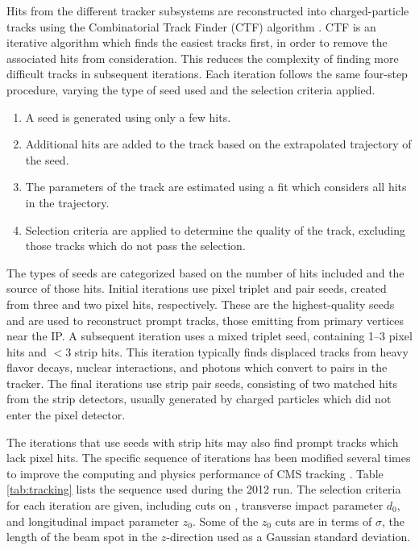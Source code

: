 Hits from the different tracker subsystems are reconstructed into charged-particle tracks using the Combinatorial Track Finder (CTF) algorithm \cite{TrackingJINST}. CTF is an iterative algorithm which finds the easiest tracks first, in order to remove the associated hits from consideration. This reduces the complexity of finding more difficult tracks in subsequent iterations. Each iteration follows the same four-step procedure, varying the type of seed used and the selection criteria applied.
\begin{enumerate}
\item A seed is generated using only a few hits.
\item Additional hits are added to the track based on the extrapolated trajectory of the seed.
\item The parameters of the track are estimated using a fit which considers all hits in the trajectory.
\item Selection criteria are applied to determine the quality of the track, excluding those tracks which do not pass the selection.
\end{enumerate}

The types of seeds are categorized based on the number of hits included and the source of those hits. Initial iterations use pixel triplet and pair seeds, created from three and two pixel hits, respectively. These are the highest-quality seeds and are used to reconstruct prompt tracks, those emitting from primary vertices near the IP. A subsequent iteration uses a mixed triplet seed, containing 1--3 pixel hits and ${<}3$ strip hits. This iteration typically finds displaced tracks from heavy flavor decays, nuclear interactions, and photons which convert to \EpEm\xspace pairs in the tracker. The final iterations use strip pair seeds, consisting of two matched hits from the strip detectors, usually generated by charged particles which did not enter the pixel detector.

The iterations that use seeds with strip hits may also find prompt tracks which lack pixel hits. The specific sequence of iterations has been modified several times to improve the computing and physics performance of CMS tracking \cite{Tracking2012}. Table \ref{tab:tracking} lists the sequence used during the 2012 run. The selection criteria for each iteration are given, including cuts on \pt, transverse impact parameter $d_0$, and longitudinal impact parameter $z_0$. Some of the $z_0$ cuts are in terms of $\sigma$, the length of the beam spot in the $z$-direction used as a Gaussian standard deviation.

